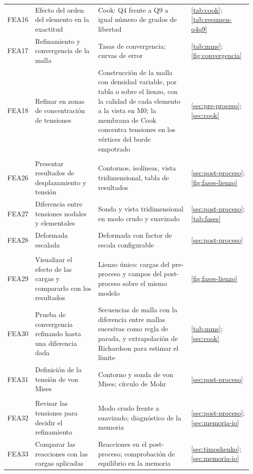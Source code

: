 {\begin{longtable}{@{}>{\raggedright\arraybackslash}p{1.3cm}>{\raggedright\arraybackslash}p{5.3cm}>{\raggedright\arraybackslash}p{5.2cm}>{\raggedright\arraybackslash}p{2.6cm}@{}}
FEA16 & Efecto del orden del elemento en la exactitud & Cook: Q4 frente a Q9 a igual número de grados de libertad & \autoref{tab:cook}; \autoref{tab:resumen-q4q9} \\
FEA17 & Refinamiento y convergencia de la malla & Tasas de convergencia; curvas de error & \autoref{tab:mms}; \autoref{fig:convergencia} \\
FEA18 & Refinar en zonas de concentración de tensiones & Construcción de la malla con densidad variable, por tabla o sobre el lienzo, con la calidad de cada elemento a la vista en M0; la membrana de Cook concentra tensiones en los vértices del borde empotrado & \autoref{sec:pre-proceso}; \autoref{sec:cook} \\
\multicolumn{4}{@{}l}{\textbf{Post-proceso}} \\
FEA26 & Presentar resultados de desplazamiento y tensión & Contornos, isolíneas, vista tridimensional, tabla de resultados & \autoref{sec:post-proceso}; \autoref{fig:fases-lienzo} \\
FEA27 & Diferencia entre tensiones nodales y elementales & Sonda y vista tridimensional en modo crudo y suavizado & \autoref{sec:post-proceso}; \autoref{tab:fases} \\
FEA28 & Deformada escalada & Deformada con factor de escala configurable & \autoref{sec:post-proceso} \\
\multicolumn{4}{@{}l}{\textbf{Conceptos fundamentales}} \\
FEA29 & Visualizar el efecto de las cargas y compararlo con los resultados & Lienzo único: cargas del pre-proceso y campos del post-proceso sobre el mismo modelo & \autoref{fig:fases-lienzo} \\
FEA30 & Prueba de convergencia refinando hasta una diferencia dada & Secuencias de malla con la diferencia entre mallas sucesivas como regla de parada, y extrapolación de Richardson para estimar el límite & \autoref{tab:mms}; \autoref{sec:cook} \\
FEA31 & Definición de la tensión de von Mises & Contorno y sonda de von Mises; círculo de Mohr & \autoref{sec:post-proceso} \\
\multicolumn{4}{@{}l}{\textbf{Verificación y validación}} \\
FEA32 & Revisar las tensiones para decidir el refinamiento & Modo crudo frente a suavizado; diagnóstico de la memoria & \autoref{sec:post-proceso}; \autoref{sec:memoria-io} \\
FEA33 & Comparar las reacciones con las cargas aplicadas & Reacciones en el post-proceso; comprobación de equilibrio en la memoria & \autoref{sec:timoshenko}; \autoref{sec:memoria-io} \\

\end{longtable}}
